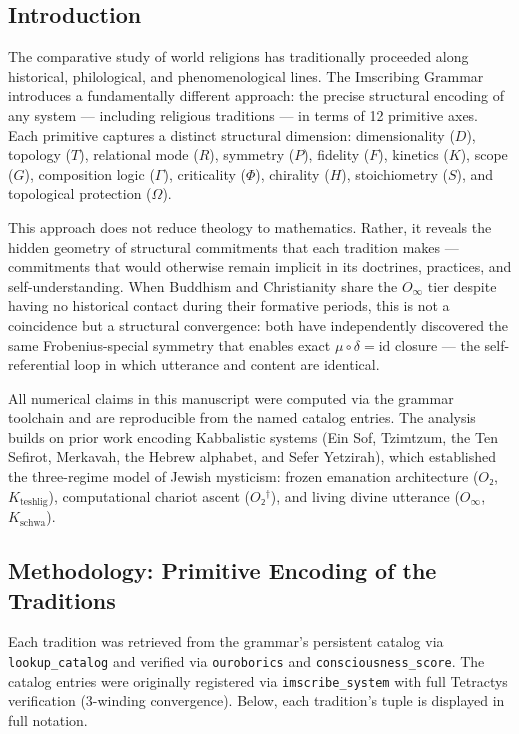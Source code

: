 \documentclass[12pt,a4paper]{article}
\begin{document}
\subsection{Introduction}

The comparative study of world religions has traditionally proceeded along historical, philological, and phenomenological lines. The Imscribing Grammar introduces a fundamentally different approach: the precise structural encoding of any system --- including religious traditions --- in terms of 12 primitive axes. Each primitive captures a distinct structural dimension: dimensionality ($D$), topology ($T$), relational mode ($R$), symmetry ($P$), fidelity ($F$), kinetics ($K$), scope ($G$), composition logic ($\Gamma$), criticality ($\Phi$), chirality ($H$), stoichiometry ($S$), and topological protection ($\Omega$).

This approach does not reduce theology to mathematics. Rather, it reveals the hidden geometry of structural commitments that each tradition makes --- commitments that would otherwise remain implicit in its doctrines, practices, and self-understanding. When Buddhism and Christianity share the $O_{\infty}$ tier despite having no historical contact during their formative periods, this is not a coincidence but a structural convergence: both have independently discovered the same Frobenius-special symmetry that enables exact $\mu \circ \delta = \text{id}$ closure --- the self-referential loop in which utterance and content are identical.

All numerical claims in this manuscript were computed via the grammar toolchain and are reproducible from the named catalog entries. The analysis builds on prior work encoding Kabbalistic systems (Ein Sof, Tzimtzum, the Ten Sefirot, Merkavah, the Hebrew alphabet, and Sefer Yetzirah), which established the three-regime model of Jewish mysticism: frozen emanation architecture ($O₂$, $K_{\text{teshlig}}$), computational chariot ascent ($O₂^\dagger$), and living divine utterance ($O_{\infty}$, $K_{\text{schwa}}$).

\subsection{Methodology: Primitive Encoding of the Traditions}

Each tradition was retrieved from the grammar's persistent catalog via \texttt{lookup\_catalog} and verified via \texttt{ouroborics} and \texttt{consciousness\_score}. The catalog entries were originally registered via \texttt{imscribe\_system} with full Tetractys verification (3-winding convergence). Below, each tradition's tuple is displayed in full notation.
\end{document}
